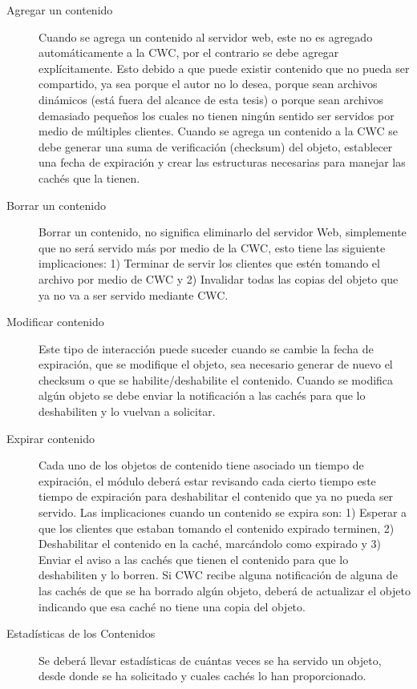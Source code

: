 \begin{description}
\item[Agregar un contenido] Cuando se agrega un contenido al servidor web, este no es agregado automáticamente a la CWC, por el contrario se debe agregar explícitamente. Esto debido a que puede existir contenido que no pueda ser compartido, ya sea porque el autor no lo desea, porque sean archivos dinámicos (está fuera del alcance de esta tesis) o porque sean archivos demasiado pequeños los cuales no tienen ningún sentido ser servidos por medio de múltiples clientes. Cuando se agrega un contenido a la CWC se debe generar una suma de verificación (checksum) del objeto, establecer una fecha de expiración y crear las estructuras necesarias para manejar las cachés que la tienen.

\item[Borrar un contenido] Borrar un contenido, no significa eliminarlo del servidor Web, simplemente que no será servido más por medio de la CWC, esto tiene las siguiente implicaciones: 1) Terminar de servir los clientes que estén tomando el archivo por medio de CWC y 2) Invalidar todas las copias del objeto que ya no va a ser servido mediante CWC.

\item [Modificar contenido] Este tipo de interacción puede suceder cuando se cambie la fecha de expiración, que se modifique el objeto, sea necesario generar de nuevo el checksum o que se habilite/deshabilite el contenido. Cuando se modifica algún objeto se debe enviar la notificación a las cachés para que lo deshabiliten y lo vuelvan a solicitar.

\item [Expirar contenido] Cada uno de los objetos de contenido tiene asociado un tiempo de expiración, el módulo deberá estar revisando cada cierto tiempo este tiempo de expiración para deshabilitar el contenido que ya no pueda ser servido. Las implicaciones cuando un contenido se expira son: 1) Esperar a que los clientes que estaban tomando el contenido expirado terminen, 2) Deshabilitar el contenido en la caché, marcándolo como expirado y 3) Enviar el aviso a las cachés que tienen el contenido para que lo deshabiliten y lo borren.
Si CWC recibe alguna notificación de alguna de las cachés de que se ha borrado algún objeto, deberá de actualizar el objeto indicando que esa caché no tiene una copia del objeto.

\item[Estadísticas de los Contenidos] Se deberá llevar estadísticas de cuántas veces se ha servido un objeto, desde donde se ha solicitado y cuales cachés lo han proporcionado.
\end{description}

